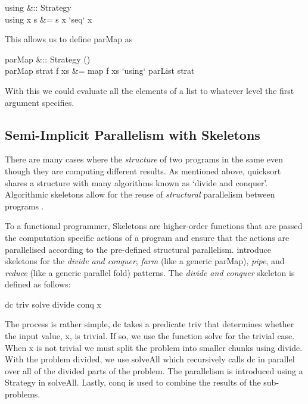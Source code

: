 \begin{haskell}
using &:: \hasalpha \to Strategy \hasalpha \to \hasalpha\\
using x s &= s x `seq` x
\end{haskell}

This allows us to define \<parMap\> as

\begin{haskell}
parMap &:: Strategy \hasbeta \to (\hasalpha \to \hasbeta) \to [\hasalpha] \to [\hasbeta]\\
parMap strat f xs &= map f xs `using` parList strat
\end{haskell}

With this we could evaluate all the elements of a list to whatever level the
first argument specifies.

\subsection{Semi-Implicit Parallelism with Skeletons}

There are many cases where the \emph{structure} of two programs in the same
even though they are computing different results. As mentioned above,
\<quicksort\> shares a structure with many algorithms known as `divide and
conquer'. Algorithmic skeletons allow for the reuse of \emph{structural}
parallelism between programs \citep{skeletons}.

To a functional programmer, Skeletons are higher-order functions that are
passed the computation specific actions of a program and ensure that the
actions are parallelised according to the pre-defined structural parallelism.
\citet{skeletons} introduce skeletons for the \emph{divide and conquer},
\emph{farm} (like a generic \<parMap\>), \emph{pipe}, and \emph{reduce} (like a generic
parallel \<fold\>) patterns. The \emph{divide and conquer} skeleton is defined as follows:

\begin{haskell}
dc triv solve divide conq x 
\end{haskell}

The process is rather simple, \<dc\> takes a predicate \<triv\> that determines
whether the input value, \<x\>, is trivial. If so, we use the function
\<solve\> for the trivial case. When \<x\> is not trivial we must split the
problem into smaller chunks using \<divide\>. With the problem divided, we use
\<solveAll\> which recursively calls \<dc\> in parallel over all of the divided
parts of the problem. The parallelism is introduced using a Strategy in
\<solveAll\>. Lastly, \<conq\> is used to combine the results of the
sub-problems.

